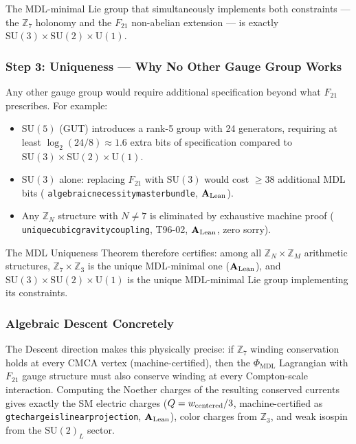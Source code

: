 \documentclass[11pt,openany]{book}
\theoremstyle{remark}
\newcommand{\PHIMDL}{\Phi_{\mathrm{MDL}}}
\newcommand{\ZS}{\mathbb{Z}_7}
\newcommand{\lean}[1]{%
  \penalty-100
  \begingroup\def\_{\textunderscore\allowbreak}\texttt{#1}\endgroup}
\newcommand{\CatAL}{\ensuremath{\textbf{A}_{\rm Lean}}}
\begin{document}
The MDL-minimal Lie group that simultaneously implements both constraints --- the
$\ZS$ holonomy and the $F_{21}$ non-abelian extension --- is exactly
$\mathrm{SU}(3)\times\mathrm{SU}(2)\times\mathrm{U}(1)$.

\subsubsection*{Step 3: Uniqueness — Why No Other Gauge Group Works}

Any other gauge group would require additional specification beyond what $F_{21}$
prescribes.  For example:
\begin{itemize}[itemsep=3pt]
\item $\mathrm{SU}(5)$ (GUT) introduces a rank-5 group with 24 generators, requiring
  at least $\log_2(24/8) \approx 1.6$ extra bits of specification compared to
  $\mathrm{SU}(3)\times\mathrm{SU}(2)\times\mathrm{U}(1)$.
\item $\mathrm{SU}(3)$ alone: replacing $F_{21}$ with $\mathrm{SU}(3)$ would cost
  $\geq 38$ additional MDL bits (\lean{algebraic\_necessity\_master\_bundle}, \CatAL).
\item Any $\mathbb{Z}_N$ structure with $N\neq 7$ is eliminated by exhaustive
  machine proof (\lean{unique\_cubic\_gravity\_coupling}, T96-02, \CatAL, zero sorry).
\end{itemize}

The MDL Uniqueness Theorem therefore certifies: among all $\mathbb{Z}_N\times\mathbb{Z}_M$
arithmetic structures, $\ZS\times\mathbb{Z}_3$ is the unique MDL-minimal one (\CatAL),
and $\mathrm{SU}(3)\times\mathrm{SU}(2)\times\mathrm{U}(1)$ is the unique MDL-minimal
Lie group implementing its constraints.

\subsubsection*{Algebraic Descent Concretely}

The Descent direction makes this physically precise: if $\ZS$ winding conservation
holds at every CMCA vertex (machine-certified), then the $\PHIMDL$ Lagrangian with
$F_{21}$ gauge structure must also conserve winding at every Compton-scale interaction.
Computing the Noether charges of the resulting conserved currents gives exactly the
SM electric charges ($Q = w_{\rm centered}/3$, machine-certified as
\lean{gte\_charge\_is\_linear\_projection}, \CatAL), color charges from $\mathbb{Z}_3$,
and weak isospin from the $\mathrm{SU}(2)_L$ sector.
\end{document}
